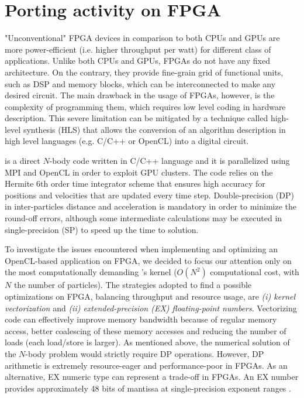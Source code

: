 \documentclass[11pt,twoside]{article}
\begin{document}
\section{Porting activity on FPGA}
"Unconventional" FPGA devices in comparison to both CPUs and GPUs are more power-efficient 
(i.e. higher throughput per watt) for different class of applications. 
Unlike both CPUs and GPUs, FPGAs do not have any fixed architecture. 
On the contrary, they provide fine-grain grid of functional units, such as DSP and memory blocks, 
which can be interconnected to make any desired circuit. 
The main drawback in the usage of FPGAs, however, is the complexity of programming them, 
which requires low level coding in hardware description. 
This severe limitation can be mitigated by a technique called high-level synthesis (HLS) 
that allows the conversion of an algorithm description in high level languages (e.g. C/C++ or OpenCL) into a digital circuit.

{} is a direct $N$-body code written in C/C++ language and it is parallelized using MPI 
and OpenCL in order to exploit GPU clusters. 
The code relies on the Hermite 6th order time integrator scheme that ensures high accuracy 
for positions and velocities that are updated every time step. 
Double-precision (DP) in inter-particles distance and acceleration is mandatory in order 
to minimize the round-off errors, although some intermediate calculations may 
be executed in single-precision (SP) to speed up the time to solution.

To investigate the issues encountered when implementing and optimizing 
an OpenCL-based application on FPGA, we decided to focus our attention only on the most 
computationally demanding {}'s kernel ($O(N^2)$ computational cost, with $N$ the number of particles). 
The strategies adopted to find a possible optimizations on FPGA, balancing throughput and resource
usage, are \emph{(i) kernel vectorization} and \emph{(ii) extended-precision (EX) floating-point numbers}.
Vectorizing code can effectively improve memory bandwidth because of regular memory access, 
better coalescing of these memory accesses and reducing the number of loads (each load/store is larger).
As mentioned above, the numerical solution of the $N$-body problem would strictly require DP
operations. However, DP arithmetic is extremely resource-eager and performance-poor in FPGAs.
As an alternative, EX numeric type can represent a trade-off in FPGAs. 
An EX number provides approximately 48 bits of mantissa at single-precision exponent ranges \citep{Thall_2006}.
\end{document}
